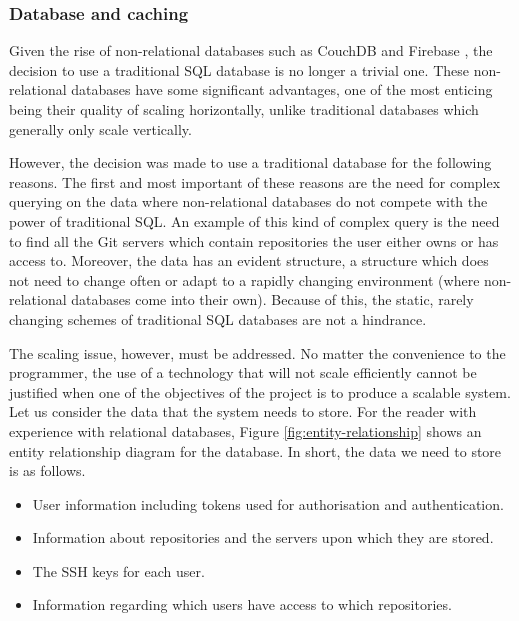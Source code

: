 \subsubsection{Database and caching}

Given the rise of non-relational databases such as CouchDB \cite{couchdb} and Firebase \cite{firebase}, the decision to use a traditional SQL database is no longer a trivial one. These non-relational databases have some significant advantages, one of the most enticing being their quality of scaling horizontally, unlike traditional databases which generally only scale vertically. 

However, the decision was made to use a traditional database for the following reasons. The first and most important of these reasons are the need for complex querying on the data where non-relational databases do not compete with the power of traditional SQL. An example of this kind of complex query is the need to find all the Git servers which contain repositories the user either owns or has access to. Moreover, the data has an evident structure, a structure which does not need to change often or adapt to a rapidly changing environment (where non-relational databases come into their own). Because of this, the static, rarely changing schemes of traditional SQL databases are not a hindrance. 

The scaling issue, however, must be addressed. No matter the convenience to the programmer, the use of a technology that will not scale efficiently cannot be justified when one of the objectives of the project is to produce a scalable system. Let us consider the data that the system needs to store. For the reader with experience with relational databases, Figure \ref{fig:entity-relationship} shows an entity relationship diagram for the database. In short, the data we need to store is as follows.

\begin{itemize}
\item User information including tokens used for authorisation and authentication.
\item Information about repositories and the servers upon which they are stored.
\item The SSH keys for each user.
\item Information regarding which users have access to which repositories.
\end{itemize}


